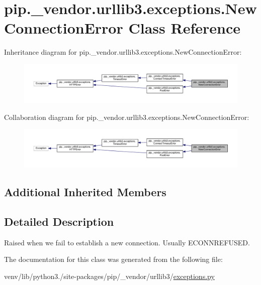 \hypertarget{classpip_1_1__vendor_1_1urllib3_1_1exceptions_1_1NewConnectionError}{}\section{pip.\+\_\+vendor.\+urllib3.\+exceptions.\+New\+Connection\+Error Class Reference}
\label{classpip_1_1__vendor_1_1urllib3_1_1exceptions_1_1NewConnectionError}


Inheritance diagram for pip.\+\_\+vendor.\+urllib3.\+exceptions.\+New\+Connection\+Error\+:
\nopagebreak
\begin{figure}[H]
\begin{center}
\leavevmode
\includegraphics[width=350pt]{classpip_1_1__vendor_1_1urllib3_1_1exceptions_1_1NewConnectionError__inherit__graph}
\end{center}
\end{figure}


Collaboration diagram for pip.\+\_\+vendor.\+urllib3.\+exceptions.\+New\+Connection\+Error\+:
\nopagebreak
\begin{figure}[H]
\begin{center}
\leavevmode
\includegraphics[width=350pt]{classpip_1_1__vendor_1_1urllib3_1_1exceptions_1_1NewConnectionError__coll__graph}
\end{center}
\end{figure}
\subsection*{Additional Inherited Members}


\subsection{Detailed Description}
\begin{DoxyVerb}Raised when we fail to establish a new connection. Usually ECONNREFUSED.\end{DoxyVerb}
 

The documentation for this class was generated from the following file\+:\begin{DoxyCompactItemize}
\item 
venv/lib/python3./site-\/packages/pip/\+\_\+vendor/urllib3/\hyperlink{pip_2__vendor_2urllib3_2exceptions_8py}{exceptions.\+py}\end{DoxyCompactItemize}
